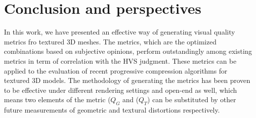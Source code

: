 \section{Conclusion and perspectives}
In this work, we have presented an effective way of generating visual quality metrics fro textured 3D meshes. The metrics, which are the optimized combinations based on subjective opinions, perform outstandingly among existing metrics in term of correlation with the HVS judgment.  These metrics can be applied to the evaluation of recent progressive compression algorithms for textured 3D models. The methodology of generating the metrics has been proven to be effective under different rendering settings and open-end as well, which means two elements of the metric ($Q_G$ and ($Q_T$) can be substituted by other future measurements of geometric and textural distortions respectively.  \\

